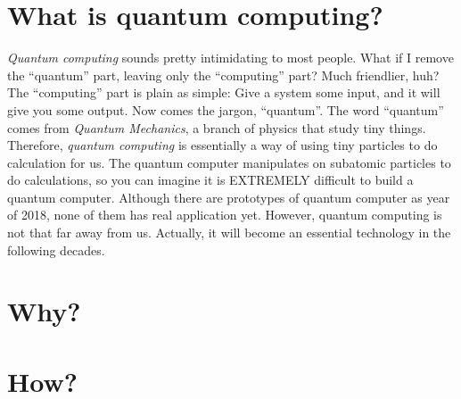 \section{\textbf{What} is quantum computing?}

\begin{fullwidth}

    \textit{Quantum computing} sounds pretty intimidating to most people. What if I remove the ``quantum'' part, leaving only the ``computing'' part? 
    Much friendlier, huh? 
    The ``computing'' part is plain as simple: Give a system some input, and it will give you some output. 
    Now comes the jargon, ``quantum''. The word ``quantum'' comes from \textit{Quantum Mechanics}, a branch of physics that study tiny things. 
    Therefore, \textit{quantum computing} is essentially a way of using tiny particles to do calculation for us.
    The quantum computer manipulates on subatomic particles to do calculations, so you can imagine it is EXTREMELY difficult to build a quantum computer.
    Although there are prototypes of quantum computer as year of 2018, none of them has real application yet.
    However, quantum computing is not that far away from us.
    Actually, it will become an essential technology in the following decades.

\end{fullwidth}

\section{Why?}
\section{How?}